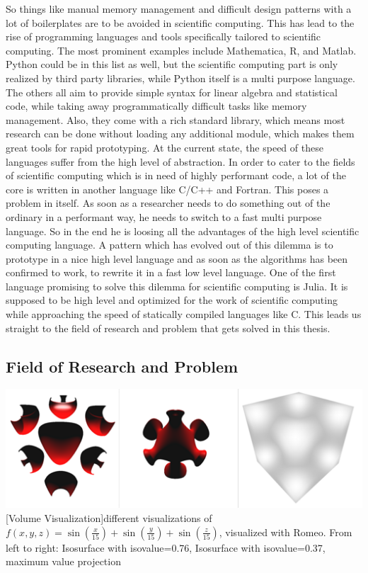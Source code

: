 So things like manual memory management and difficult design patterns with a lot of boilerplates are to be avoided in scientific computing.
This has lead to the rise of programming languages and tools specifically tailored to scientific computing.
The most prominent examples include Mathematica, R, and Matlab. Python could be in this list as well, but the scientific computing part is only realized by third party libraries, while Python itself is a multi purpose language.
The others all aim to provide simple syntax for linear algebra and statistical code, while taking away programmatically difficult tasks like memory management. 
Also, they come with a rich standard library, which means most research can be done without loading any additional module, which makes them great tools for rapid prototyping.
At the current state, the speed of these languages suffer from the high level of abstraction. In order to cater to the fields of scientific computing which is in need of highly performant code, a lot of the core is written in another language like C/C++ and Fortran. This poses a problem in itself. 
As soon as a researcher needs to do something out of the ordinary in a performant way, he needs to switch to a fast multi purpose language. So in the end he is loosing all the advantages of the high level scientific computing language.
A pattern which has evolved out of this dilemma is to prototype in a nice high level language and as soon as the algorithms has been confirmed to work, to rewrite it in a fast low level language.
One of the first language promising to solve this dilemma for scientific computing is Julia. 
It is supposed to be high level and optimized for the work of scientific computing while approaching the speed of statically compiled languages like C.
This leads us straight to the field of research and problem that gets solved in this thesis.

\subsection{Field of Research and Problem}

\vspace{1em}
\begin{minipage}{\linewidth}
    \centering
    \includegraphics[width=0.7\linewidth]{graphics/surfaces.png}
    [Volume Visualization]{different visualizations of $f(x,y,z)=\sin(\frac{x}{15})+\sin(\frac{y}{15})+\sin(\frac{z}{15})$, visualized with Romeo. From left to right: Isosurface with isovalue=0.76, Isosurface with isovalue=0.37, maximum value projection}
    \label{fig:volume}
\end{minipage}
\vspace{1em}

